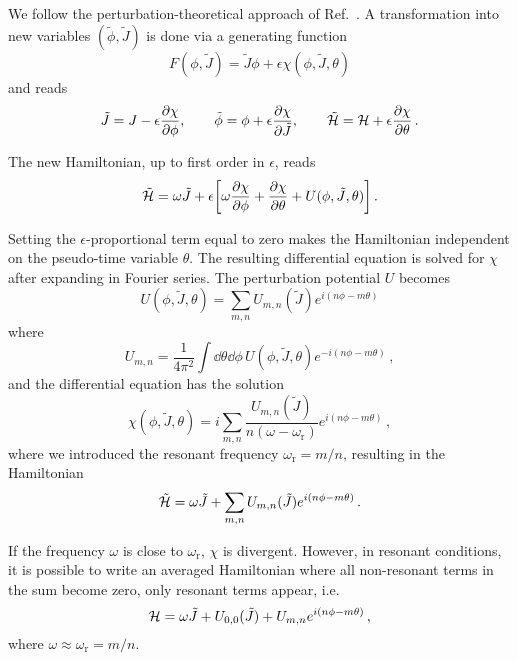 We follow the perturbation-theoretical approach of Ref.~\cite{wilson}. A transformation into new variables $(\tilde \phi, \tilde J)$ is done via a generating function
\begin{equation}
	F(\phi, \tilde J) = \tilde J \phi + \epsilon\chi(\phi,\tilde J,\theta)
\end{equation}
%
and reads
\begin{equation}
	\tilde J = J - \epsilon\pdv{\chi}{\phi},\qquad \tilde \phi = \phi + \epsilon \pdv{\chi}{\tilde J},\qquad \tilde{\mathcal{H}} = \mathcal{H} + \epsilon \pdv{\chi}{\theta}\,.
\end{equation}

The new Hamiltonian, up to first order in $\epsilon$, reads
%
\begin{equation}
	\tilde{\mathcal{H}} = \omega \tilde J + \epsilon\qty[\omega \pdv{\chi}{\phi} + \pdv{\chi}{\theta} + U(\phi, \tilde J, \theta)]\,. 
\end{equation}

Setting the $\epsilon$-proportional term equal to zero makes the Hamiltonian independent on the pseudo-time variable $\theta$. The resulting differential equation is solved for $\chi$ after expanding in Fourier series. The perturbation potential $U$ becomes
%
\begin{equation}
	U(\phi, \tilde J, \theta) = \sum_{m,n} U_{m,n}(\tilde J) e^{i(n\phi - m\theta)}
\end{equation}
%
where
%
\begin{equation}
	U_{m,n} = \frac{1}{4\pi^2}\int\dd\theta\dd\phi\, U(\phi,\tilde J,\theta) e^{-i(n\phi-m\theta)}\, ,
\end{equation}
%
and the differential equation has the solution
%
\begin{equation}
	\chi(\phi, \tilde J, \theta) = i\sum_{m,n} \frac{U_{m,n}(\tilde J)}{n(\omega-\omega_\text{r})} e^{i(n\phi - m\theta)}\,,
\end{equation}
%
where we introduced the resonant frequency $\omega_\text{r} = m/n$, resulting in the Hamiltonian
%
\begin{equation}
	\tilde{\mathcal{H}} = \omega \tilde J + \sum_{m,n} U_{m,n}(\tilde J) e^{i(n\phi-m\theta)}\,.
\end{equation}

If the frequency $\omega$ is close to $\omega_\text{r}$, $\chi$ is divergent. However, in resonant conditions, it is possible to write an averaged Hamiltonian where all non-resonant terms in the sum become zero, only resonant terms appear, i.e.\
\begin{equation}
	\mathcal{H} = \omega \tilde J + U_{0,0}(\tilde J) + U_{m,n}e^{i(n\phi-m\theta)}\,,
\end{equation}
%
where $\omega \approx \omega_\text{r}=m/n$.

